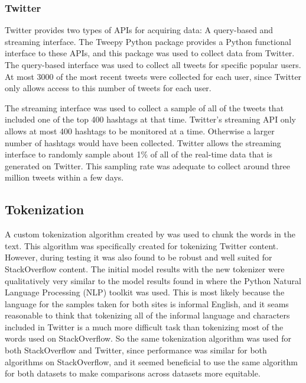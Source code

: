 \documentclass[man,floatsintext,donotrepeattitle]{apa6}
\begin{document}
\subsubsection{Twitter}

Twitter provides two types of APIs for acquiring data: A query-based and streaming interface.
The Tweepy Python package provides a Python functional interface to these APIs, and this package was used to collect data from Twitter.
The query-based interface was used to collect all tweets for specific popular users.
At most \num{3000} of the most recent tweets were collected for each user, since Twitter only allows access to this number of tweets for each user.

The streaming interface was used to collect a sample of all of the tweets that included one of the top 400 hashtags at that time.
Twitter's streaming API only allows at most 400 hashtags to be monitored at a time.
Otherwise a larger number of hashtags would have been collected.
Twitter allows the streaming interface to randomly sample about 1\% of all of the real-time data that is generated on Twitter.
This sampling rate was adequate to collect around three million tweets within a few days.

\subsection{Tokenization}

A custom tokenization algorithm created by \textcite{Owoputi2013} was used to chunk the words in the text.
This algorithm was specifically created for tokenizing Twitter content.
However, during testing it was also found to be robust and well suited for StackOverflow content.
The initial model results with the new tokenizer were qualitatively very similar to the model results found in \textcite{Stanley2013} where the Python Natural Language Processing (NLP) toolkit \parencite{Bird2009} was used.
This is most likely because the language for the samples taken for both sites is informal English,
and it seams reasonable to think that tokenizing all of the informal language and characters included in Twitter is a much more difficult task than tokenizing most of the words used on StackOverflow.
So the same tokenization algorithm was used for both StackOverflow and Twitter, since performance was similar for both algorithms on StackOverflow,
and it seemed beneficial to use the same algorithm for both datasets to make comparisons across datasets more equitable.
\end{document}
